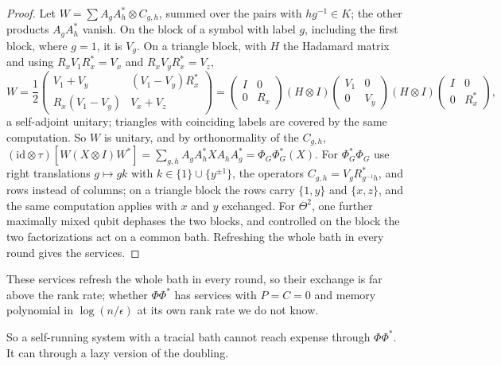 \begin{proof}
Let $W=\sum A_gA_h^*\otimes C_{g,h}$, summed over the pairs with $hg^{-1}\in K$; the other products $A_gA_h^*$ vanish. On the block of a symbol
with label $g$, including the first block, where $g=1$, it is $V_g$. On a triangle block, with $H$ the Hadamard matrix and using
$R_xV_1R_x^*=V_x$ and $R_xV_yR_x^*=V_z$,
\[
W=\frac12\begin{pmatrix}V_1+V_y&(V_1-V_y)R_x^*\\ R_x(V_1-V_y)&V_x+V_z\end{pmatrix}
=\begin{pmatrix}I&0\\0&R_x\end{pmatrix}(H\otimes I)\begin{pmatrix}V_1&0\\0&V_y\end{pmatrix}(H\otimes I)\begin{pmatrix}I&0\\0&R_x^*\end{pmatrix},
\]
a self-adjoint unitary; triangles with coinciding labels are covered by the same computation. So $W$ is unitary, and by orthonormality of the
$C_{g,h}$, $(\mathrm{id}\otimes\tau)[W(X\otimes I)W^*]=\sum_{g,h}A_gA_h^*XA_hA_g^*=\Phi_G\Phi_G^*(X)$. For $\Phi_G^*\Phi_G$ use right translations
$g\mapsto gk$ with $k\in\{1\}\cup\{y^{\pm1}\}$, the operators $C_{g,h}=V_gR_{g^{-1}h}^*$, and rows instead of columns; on a triangle block the rows carry
$\{1,y\}$ and $\{x,z\}$, and the same computation applies with $x$ and $y$ exchanged. For $\Theta^2$, one further maximally mixed qubit dephases the
two blocks, and controlled on the block the two factorizations act on a common bath. Refreshing the whole bath in every round gives the services.
\end{proof}

These services refresh the whole bath in every round, so their exchange is far above the rank rate; whether $\Phi\Phi^*$ has services with $P=C=0$ and
memory polynomial in $\log(n/\epsilon)$ at its own rank rate we do not know.

So a self-running system with a tracial bath cannot reach expense through $\Phi\Phi^*$. It can through a lazy version of the doubling.

